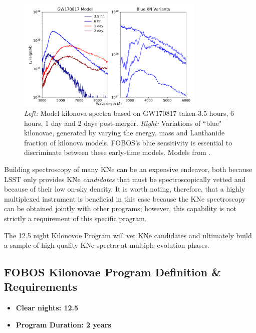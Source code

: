 \documentclass[11pt,a4paper,twoside,onecolumn,openany,final,oldfontcommands]{memoir}
\begin{document}
\begin{figure}
\begin{center}
\includegraphics[width=0.8\textwidth]{figs/kn_fobos.pdf}
\end{center}
\caption[Model spectra of kilonovae]{\textit{Left:} Model kilonova spectra based on GW170817 taken 3.5 hours, 6 hours, 1 day and 2 days post-merger. \textit{Right:} Variations of ``blue" kilonovae, generated by varying the energy, mass and Lanthanide fraction of kilonova models. FOBOS's blue sensitivity is essential to discriminate between these early-time models. Models from \citet{kasen2017}.}
\label{fig:kilonova}    
\end{figure}

Building spectroscopy of many KNe can be an expensive endeavor, both because LSST only provides KNe \textit{candidates} that must be spectroscopically vetted and because of their low on-sky density.  It is worth noting, therefore, that a highly multiplexed instrument is beneficial in this case because the KNe spectroscopy can be obtained jointly with other programs; however, this capability is not strictly a requirement of this specific program.

The 12.5 night Kilonovoe Program will vet KNe candidates and ultimately build a sample of high-quality KNe spectra at multiple evolution phases.  

\subsection{FOBOS Kilonovae Program Definition \& Requirements}

\medskip
\begin{itemize}[leftmargin=0.3in, itemsep=0pt]
	\item[] \textbf{Clear nights: 12.5}
	\item[] \textbf{Program Duration: 2 years}
\end{itemize}
\end{document}
